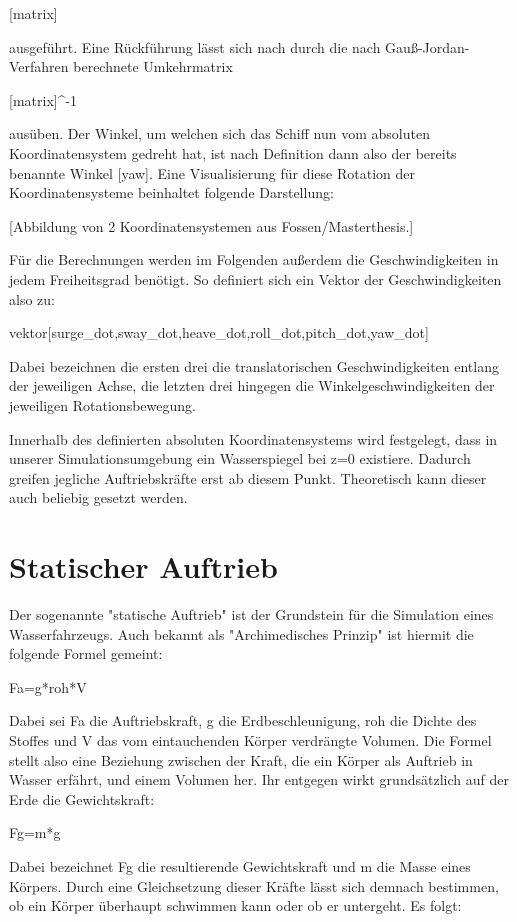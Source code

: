[matrix]

ausgeführt. Eine Rückführung lässt sich nach durch die nach Gauß-Jordan-Verfahren berechnete Umkehrmatrix

[matrix]^-1

ausüben. 
Der Winkel, um welchen sich das Schiff nun vom absoluten Koordinatensystem gedreht hat, ist nach Definition dann also der bereits benannte Winkel [yaw].
Eine Visualisierung für diese Rotation der Koordinatensysteme beinhaltet folgende Darstellung:

[Abbildung von 2 Koordinatensystemen aus Fossen/Masterthesis.]

Für die Berechnungen werden im Folgenden außerdem die Geschwindigkeiten in jedem Freiheitsgrad benötigt. So definiert sich ein Vektor der Geschwindigkeiten also zu:

vektor[surge_dot,sway_dot,heave_dot,roll_dot,pitch_dot,yaw_dot]

Dabei bezeichnen die ersten drei die translatorischen Geschwindigkeiten entlang der jeweiligen Achse, die letzten drei hingegen die Winkelgeschwindigkeiten der jeweiligen Rotationsbewegung.

Innerhalb des definierten absoluten Koordinatensystems wird festgelegt, dass in unserer Simulationsumgebung ein Wasserspiegel bei z=0 existiere. Dadurch greifen jegliche Auftriebskräfte erst ab diesem Punkt. Theoretisch kann dieser auch beliebig gesetzt werden. 

\section{Statischer Auftrieb}
%
Der sogenannte "statische Auftrieb" ist der Grundstein für die Simulation eines Wasserfahrzeugs. Auch bekannt als "Archimedisches Prinzip" ist hiermit die folgende Formel gemeint:

Fa=g*roh*V

Dabei sei Fa die Auftriebskraft, g die Erdbeschleunigung, roh die Dichte des Stoffes und V das vom eintauchenden Körper verdrängte Volumen. 
Die Formel stellt also eine Beziehung zwischen der Kraft, die ein Körper als Auftrieb in Wasser erfährt, und einem Volumen her. 
Ihr entgegen wirkt grundsätzlich auf der Erde die Gewichtskraft:

Fg=m*g

Dabei bezeichnet Fg die resultierende Gewichtskraft und m die Masse eines Körpers. Durch eine Gleichsetzung dieser Kräfte lässt sich demnach bestimmen, ob ein Körper überhaupt schwimmen kann oder ob er untergeht. 
Es folgt:


